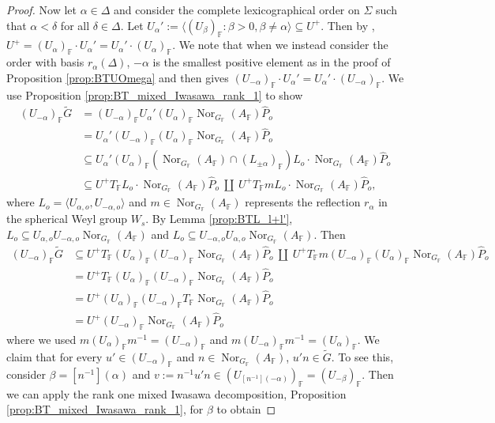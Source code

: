 \documentclass[12pt]{amsart}
\newcommand{\F}{\mathbb{F} }
\numberwithin{equation}{section}
\theoremstyle{remark} %
\begin{document}
\begin{proof}
			Now let $\alpha \in \Delta$ and consider the complete lexicographical order on $\Sigma$ such that $\alpha < \delta$ for all $\delta \in \Delta$. Let $U_\alpha' := \langle (U_\beta)_\F \colon \beta >0, \beta \neq \alpha\rangle \subseteq U^+$. Then by \cite[Lemma \ref{I-lem:BCH_normalizer}]{AppAGRCF}, $U^+ = (U_\alpha)_\F \cdot U_\alpha' = U_\alpha' \cdot (U_\alpha)_\F$. We note that when we instead consider the order with basis $r_\alpha(\Delta)$, $-\alpha$ is the smallest positive element as in the proof of Proposition \ref{prop:BTUOmega} and then \cite[Lemma \ref{I-lem:BCH_normalizer}]{AppAGRCF} gives $(U_{-\alpha})_\F \cdot U_\alpha' = U_\alpha' \cdot (U_{-\alpha})_\F$. We use Proposition \ref{prop:BT_mixed_Iwasawa_rank_1} to show
			\begin{align*}
				(U_{-\alpha})_\F \tilde{G} &= (U_{-\alpha})_\F U_\alpha' (U_\alpha)_\F \operatorname{Nor}_{G_\F}(A_\F) \hat{P}_o \\
				&= U_\alpha' (U_{-\alpha})_\F (U_\alpha)_\F \operatorname{Nor}_{G_\F}(A_\F) \hat{P}_o \\
				&\subseteq U_\alpha' (U_\alpha)_\F (\operatorname{Nor}_{G_\F}(A_\F) \cap (L_{\pm\alpha})_\F) L_o \cdot \operatorname{Nor}_{G_\F}(A_\F) \hat{P}_o \\
				&\subseteq  U^+ T_\F L_o \cdot \operatorname{Nor}_{G_\F}(A_\F) \hat{P}_o \ \amalg \ U^+ T_\F  m L_o \cdot \operatorname{Nor}_{G_\F}(A_\F) \hat{P}_o,
			\end{align*}
			where $L_o = \langle U_{\alpha, o}, U_{-\alpha, o} \rangle$ and $m\in \operatorname{Nor}_{G_\F}(A_\F)$ represents the reflection $r_\alpha$ in the spherical Weyl group $W_s$. By Lemma \ref{prop:BTL_l+l'}, $L_o \subseteq U_{\alpha, o} U_{-\alpha,o} \operatorname{Nor}_{G_\F}(A_\F)$ and $L_o \subseteq U_{-\alpha, o} U_{\alpha,o} \operatorname{Nor}_{G_\F}(A_\F)$. Then
			\begin{align*}
				(U_{-\alpha})_\F \tilde{G} & \subseteq U^+ T_\F (U_\alpha)_\F (U_{-\alpha})_\F \operatorname{Nor}_{G_\F}(A_\F) \hat{P}_o \ \amalg \ U^+ T_\F m (U_{-\alpha})_\F (U_{\alpha})_\F \operatorname{Nor}_{G_\F}(A_\F) \hat{P}_o \\
				&=  U^+ T_\F (U_\alpha)_\F (U_{-\alpha})_\F \operatorname{Nor}_{G_\F}(A_\F) \hat{P}_o \\
				&= U^+ (U_\alpha)_\F (U_{-\alpha})_\F T_\F \operatorname{Nor}_{G_\F}(A_\F) \hat{P}_o \\
				&= U^+ (U_{-\alpha})_\F \operatorname{Nor}_{G_\F}(A_\F) \hat{P}_o
			\end{align*}
			where we used $m (U_{\alpha})_\F m^{-1} = (U_{-\alpha})_\F$ and $m (U_{-\alpha})_\F m^{-1} = (U_{\alpha})_\F$. We claim that for every $u' \in (U_{-\alpha})_\F$ and $n \in \operatorname{Nor}_{G_\F}(A_\F)$, $u'n \in \tilde{G}$. To see this, consider $\beta = [n^{-1}](\alpha)$ and $v := n^{-1}u'n\in (U_{[n^{-1}](-\alpha)})_\F = (U_{-\beta})_\F $. Then we can apply the rank one mixed Iwasawa decomposition, Proposition \ref{prop:BT_mixed_Iwasawa_rank_1}, for $\beta$ to obtain 

\end{proof}
\end{document}
